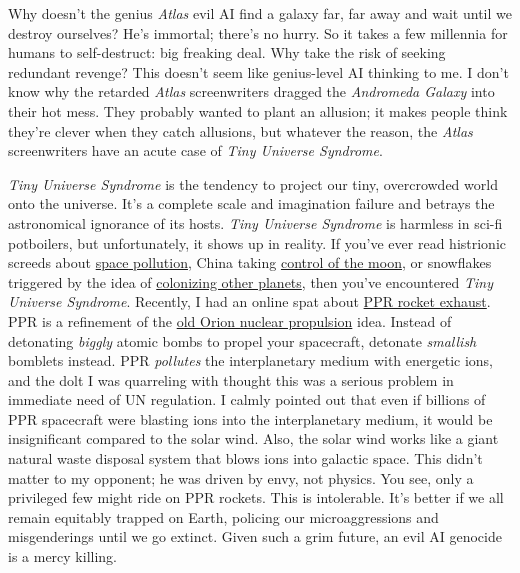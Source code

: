 Why doesn't the genius \emph{Atlas} evil AI find a galaxy far, far away
and wait until we destroy ourselves? He's immortal; there's no hurry.
So it takes a few millennia for humans to self-destruct: big freaking
deal. Why take the risk of seeking redundant revenge? This doesn't seem
like genius-level AI thinking to me. I don't know why the retarded
\emph{Atlas} screenwriters dragged the \emph{Andromeda Galaxy} into
their hot mess. They probably wanted to plant an allusion; it makes
people think they're clever when they catch allusions, but whatever the
reason, the \emph{Atlas} screenwriters have an acute case of \emph{Tiny
Universe Syndrome}.

\emph{Tiny Universe Syndrome} is the tendency to project our tiny,
overcrowded world onto the universe. It's a complete scale and
imagination failure and betrays the astronomical ignorance of its hosts.
\emph{Tiny Universe Syndrome} is harmless in sci-fi potboilers, but
unfortunately, it shows up in reality. If you've ever read histrionic
screeds about
\href{https://www.weforum.org/agenda/2022/07/environmental-impact-space-debris-how-to-solve-it/}{space
pollution}, China taking
\href{https://www.npr.org/2024/05/06/1249249941/nasa-bill-nelson-moon-artemis-china-starliner}{control
of the moon}, or snowflakes triggered by the idea of
\href{https://theconversation.com/the-billionaire-space-race-reflects-a-colonial-mindset-that-fails-to-imagine-a-different-world-165235}{colonizing
other planets}, then you've encountered \emph{Tiny Universe Syndrome}.
Recently, I had an online spat about
\href{https://www.nasa.gov/directorates/stmd/niac/niac-studies/pulsed-plasma-rocket-ppr-shielded-fast-transits-for-humans-to-mars/}{PPR
rocket exhaust}. PPR is a refinement of the
\href{https://en.wikipedia.org/wiki/Project_Orion_(nuclear_propulsion)}{old
Orion nuclear propulsion} idea. Instead of detonating \emph{biggly}
atomic bombs to propel your spacecraft, detonate \emph{smallish}
bomblets instead. PPR \emph{pollutes} the interplanetary medium with
energetic ions, and the dolt I was quarreling with thought this was a
serious problem in immediate need of UN regulation. I calmly pointed out
that even if billions of PPR spacecraft were blasting ions into the
interplanetary medium, it would be insignificant compared to the solar
wind. Also, the solar wind works like a giant natural waste disposal
system that blows ions into galactic space. This didn't matter to my
opponent; he was driven by envy, not physics. You see, only a privileged
few might ride on PPR rockets. This is intolerable. It's better if we
all remain equitably trapped on Earth, policing our microaggressions and
misgenderings until we go extinct. Given such a grim future, an evil AI
genocide is a mercy killing.

